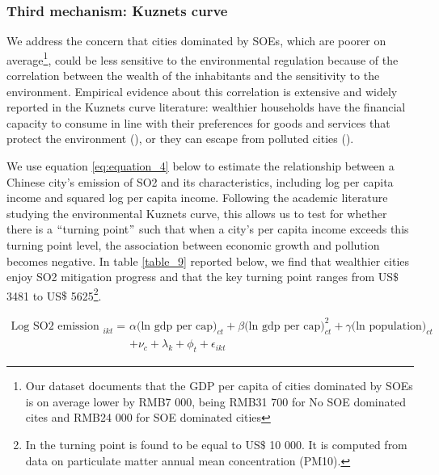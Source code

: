 \documentclass[12pt]{article}
\begin{document}
\subsubsection{Third mechanism: Kuznets curve}



We address the concern that cities dominated by SOEs, which are poorer on average\footnote{Our dataset documents that the GDP per capita of cities dominated by SOEs is on average lower by RMB7 000, being RMB31 700 for No SOE dominated cites and RMB24 000 for SOE dominated cities}, could be less sensitive to the environmental regulation because of the correlation between the wealth of the inhabitants and the sensitivity to the environment. Empirical evidence about this correlation is extensive and widely reported in the Kuznets curve literature: wealthier households have the financial capacity to consume in line with their preferences for goods and services that protect the environment (\cite{Berger2019-jl,Chen2018-ki}), or they can escape from polluted cities (\cite{Chen2017-ro}).


We use equation \ref{eq:equation_4} below to estimate the relationship between a Chinese city's emission of SO2 and its characteristics, including log per capita income and squared log per capita income. Following the academic literature studying the environmental Kuznets curve, this allows us to test for whether there is a $``$turning point$"$ such that when a city's per capita income exceeds this turning point level, the association between economic growth and pollution becomes negative. In table \ref{table_9} reported below, we find that wealthier cities enjoy SO2 mitigation progress and that the key turning point ranges from US$\$$ 3481 to US$\$$ 5625\footnote{In \cite{Kahn2016-fi} the turning point is found to be equal to US$\$$ 10 000. It is computed from data on particulate matter annual mean concentration (PM10).}. 

\begin{equation} \label{eq:equation_4}
\begin{aligned}
\text {Log SO2 emission }_{i k t} = & \alpha \text{(ln gdp per cap)}_{ct}  + \beta\text{(ln gdp per cap)}^2_{ct}  + \gamma \text{(ln population)}_{ct} \\ 
& + \nu_{c}+\lambda_{k}+\phi_{t}+\epsilon_{i k t}
\end{aligned}
\end{equation}
\end{document}
